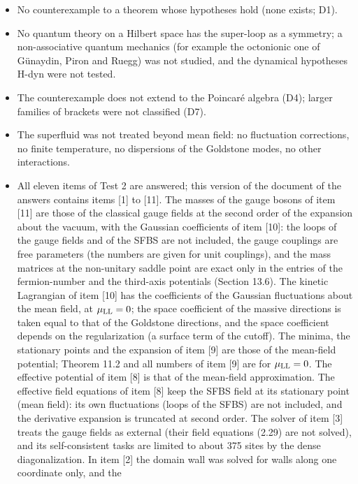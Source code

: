 \documentclass[
  10pt,
]{article}
\begin{document}
\begin{itemize}
\item
  No counterexample to a theorem whose hypotheses hold (none exists;
  D1).
\item
  No quantum theory on a Hilbert space has the super-loop as a symmetry;
  a non-associative quantum mechanics (for example the octonionic one of
  Günaydin, Piron and Ruegg) was not studied, and the dynamical
  hypotheses H-dyn were not tested.
\item
  The counterexample does not extend to the Poincaré algebra (D4);
  larger families of brackets were not classified (D7).
\item
  The superfluid was not treated beyond mean field: no fluctuation
  corrections, no finite temperature, no dispersions of the Goldstone
  modes, no other interactions.
\item
  All eleven items of Test 2 are answered; this version of the document
  of the answers contains items {[}1{]} to {[}11{]}. The masses of the
  gauge bosons of item {[}11{]} are those of the classical gauge fields
  at the second order of the expansion about the vacuum, with the
  Gaussian coefficients of item {[}10{]}: the loops of the gauge fields
  and of the SFBS are not included, the gauge couplings are free
  parameters (the numbers are given for unit couplings), and the mass
  matrices at the non-unitary saddle point are exact only in the entries
  of the fermion-number and the third-axis potentials (Section 13.6).
  The kinetic Lagrangian of item {[}10{]} has the coefficients of the
  Gaussian fluctuations about the mean field, at \(\mu_{\rm LL}=0\); the
  space coefficient of the massive directions is taken equal to that of
  the Goldstone directions, and the space coefficient depends on the
  regularization (a surface term of the cutoff). The minima, the
  stationary points and the expansion of item {[}9{]} are those of the
  mean-field potential; Theorem 11.2 and all numbers of item {[}9{]} are
  for \(\mu_{\rm LL}=0\). The effective potential of item {[}8{]} is
  that of the mean-field approximation. The effective field equations of
  item {[}8{]} keep the SFBS field at its stationary point (mean field):
  its own fluctuations (loops of the SFBS) are not included, and the
  derivative expansion is truncated at second order. The solver of item
  {[}3{]} treats the gauge fields as external (their field equations
  (2.29) are not solved), and its self-consistent tasks are limited to
  about 375 sites by the dense diagonalization. In item {[}2{]} the
  domain wall was solved for walls along one coordinate only, and the

\end{itemize}
\end{document}
